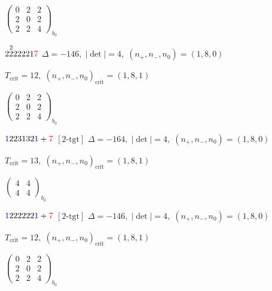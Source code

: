 \documentclass[10pt]{article}
\begin{document}
\hspace{2em}$\left(\begin{smallmatrix}0 & 2 & 2 \\ 2 & 0 & 2 \\ 2 & 2 & 4\end{smallmatrix}\right)_{\!b_0}$

\smallskip

$2\overset{2}{2}22221\textcolor{red}{7}$ \quad $\Delta=-146,\; |\det|=4,\; (n_+,n_-,n_0)=(1,8,0)$

\hspace{1em}$T_{\text{crit}}=12,\; (n_+,n_-,n_0)_{\text{crit}}=(1,8,1)$

\hspace{2em}$\left(\begin{smallmatrix}0 & 2 & 2 \\ 2 & 0 & 2 \\ 2 & 2 & 4\end{smallmatrix}\right)_{\!b_0}$

\smallskip

$\textcolor{blue}{1}223132\textcolor{blue}{1}+\textcolor{red}{7}$ $\scriptstyle [2\text{-tgt}]$ \quad $\Delta=-164,\; |\det|=4,\; (n_+,n_-,n_0)=(1,8,0)$

\hspace{1em}$T_{\text{crit}}=13,\; (n_+,n_-,n_0)_{\text{crit}}=(1,8,1)$

\hspace{2em}$\left(\begin{smallmatrix}4 & 4 \\ 4 & 4\end{smallmatrix}\right)_{\!b_0}$

\smallskip

$\textcolor{blue}{1}222222\textcolor{blue}{1}+\textcolor{red}{7}$ $\scriptstyle [2\text{-tgt}]$ \quad $\Delta=-146,\; |\det|=4,\; (n_+,n_-,n_0)=(1,8,0)$

\hspace{1em}$T_{\text{crit}}=12,\; (n_+,n_-,n_0)_{\text{crit}}=(1,8,1)$

\hspace{2em}$\left(\begin{smallmatrix}0 & 2 & 2 \\ 2 & 0 & 2 \\ 2 & 2 & 4\end{smallmatrix}\right)_{\!b_0}$
\end{document}
